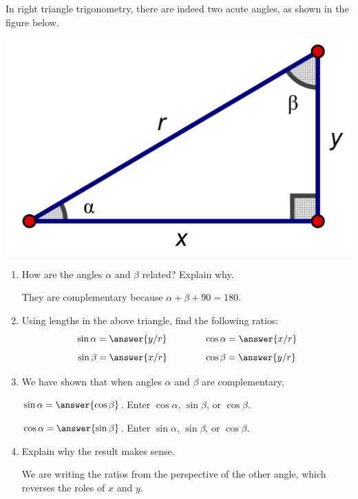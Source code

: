 \documentclass[nooutcomes]{ximera}
\begin{document}
\begin{problem}
In right triangle trigonometry, there are indeed two acute angles, as shown in the figure below.
\begin{image}
\includegraphics[scale=0.8]{rightTriangle2.png}
\end{image}
\begin{enumerate}
\item How are the angles $\alpha$ and $\beta$ related?  Explain why.  \begin{hint}They are complementary because $\alpha+\beta+90=180$.\end{hint}
\item Using lengths in the above triangle, find the following ratios:    
\[
\sin\alpha = \answer{y/r} \qquad\qquad \cos\alpha = \answer{x/r}
\]
\[
\sin\beta = \answer{x/r} \qquad\qquad \cos\beta = \answer{y/r}
\]
\item We have shown that when angles $\alpha$ and $\beta$ are complementary, 

$\sin\alpha=\answer{\cos\beta}$.  \qquad Enter $\cos\alpha$, $\sin\beta$, or $\cos\beta$.  

$\cos\alpha =\answer{\sin\beta}$.  \qquad Enter $\sin\alpha$, $\sin\beta$, or $\cos\beta$.  

\item Explain why the result makes sense.  \begin{hint}We are writing the ratios from the perspective of the other angle, which reverses 
the roles of $x$ and $y$.\end{hint}
\end{enumerate}
\end{problem}
\end{document}
